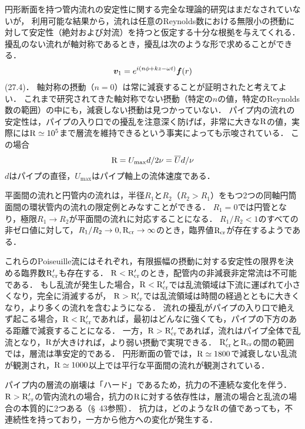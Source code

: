 円形断面を持つ管内流れの安定性に関する完全な理論的研究はまだなされていないが，
利用可能な結果から，流れは任意のReynolds数における無限小の摂動に対して安定性（絶対および対流）を持つと仮定する十分な根拠を与えてくれる．
擾乱のない流れが軸対称であるとき，擾乱は次のような形で求めることができる．
\begin{equation}
    \vb*{v}_1 = e^{i(n\phi+kz-\omega t)} \vb*{f}(r)
\end{equation}
(27.4)．
軸対称の摂動（$n=0$）は常に減衰することが証明されたと考えてよい．
これまで研究されてきた軸対称でない摂動（特定の$n$の値，特定のReynolds数の範囲）の中にも，減衰しない摂動は見つかっていない．
パイプ内の流れの安定性は，パイプの入り口での擾乱を注意深く防げば，非常に大きな$\mathrm{R}$の値，実際には$\mathrm{R} \simeq 10^5$まで層流を維持できるという事実によっても示唆されている．
この場合 
\begin{equation}
    \mathrm{R} = U_\mathrm{max} d/2\nu = \overline{U}d/\nu
\end{equation}
$d$はパイプの直径，$U_\mathrm{max}$はパイプ軸上の流体速度である．



平面間の流れと円管内の流れは，半径$R_1$と$R_2$（$R_2>R_1$）をもつ2つの同軸円筒面間の環状管内の流れの限定例とみなすことができる．
$R_1=0$では円管となり，極限$R_1 \to R_2$が平面間の流れに対応することになる．
$R_1/R_2 < 1$のすべての非ゼロ値に対して，$R_1/R_2 \to 0, \mathrm{R}_{\mathrm{cr}} \to \infty$のとき，臨界値$\mathrm{R}_{\mathrm{cr}}$が存在するようである．




これらのPoiseuille流にはそれぞれ，有限振幅の摂動に対する安定性の限界を決める臨界数$\mathrm{R}_{\mathrm{cr}}'$も存在する．
$\mathrm{R}<\mathrm{R}_{\mathrm{cr}}'$のとき，配管内の非減衰非定常流は不可能である．
もし乱流が発生した場合，$\mathrm{R}<\mathrm{R}_{\mathrm{cr}}'$では乱流領域は下流に運ばれて小さくなり，完全に消滅するが，
$\mathrm{R}>\mathrm{R}_{\mathrm{cr}}'$では乱流領域は時間の経過とともに大きくなり，より多くの流れを含むようになる．
流れの擾乱がパイプの入り口で絶えず起こる場合，$\mathrm{R}<\mathrm{R}_{\mathrm{cr}}'$であれば，最初はどんなに強くても，パイプの下方のある距離で減衰することになる．
一方，$\mathrm{R}>\mathrm{R}_{\mathrm{cr}}'$であれば，流れはパイプ全体で乱流となり，$\mathrm{R}$が大きければ，より弱い摂動で実現できる．
$\mathrm{R}_{\mathrm{cr}}'$と$\mathrm{R}_{\mathrm{cr}}$の間の範囲では，層流は準安定的である．
円形断面の管では，$\mathrm{R} \simeq 1800$で減衰しない乱流が観測され，$\mathrm{R} \simeq 1000$以上では平行な平面間の流れが観測されている．




パイプ内の層流の崩壊は「ハード」であるため，抗力の不連続な変化を伴う．
$\mathrm{R}>\mathrm{R}_{\mathrm{cr}}'$の管内流れの場合，抗力の$\mathrm{R}$に対する依存性は，層流の場合と乱流の場合の本質的に2つある（\S~43参照）．
抗力は，どのような$\mathrm{R}$の値であっても，不連続性を持っており，一方から他方への変化が発生する．



